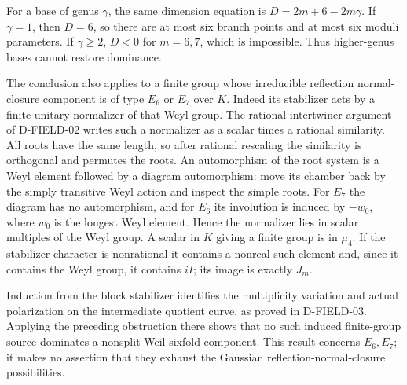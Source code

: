 For a base of genus \(\gamma\), the same dimension equation is
\(D=2m+6-2m\gamma\). If \(\gamma=1\), then \(D=6\), so there
are at most six branch points and at most six moduli parameters.
If \(\gamma\ge2\), \(D<0\) for \(m=6,7\), which is impossible.
Thus higher-genus bases cannot restore dominance.

The conclusion also applies to a finite group whose irreducible
reflection normal-closure component is of type \(E_6\) or \(E_7\)
over \(K\). Indeed its stabilizer acts by a finite unitary normalizer
of that Weyl group. The rational-intertwiner argument of D-FIELD-02
writes such a normalizer as a scalar times a rational similarity.
All roots have the same length, so after rational rescaling the similarity
is orthogonal and permutes the roots. An automorphism of the root system
is a Weyl element followed by a diagram automorphism: move its chamber
back by the simply transitive Weyl action and inspect the simple roots.
For \(E_7\) the diagram has no automorphism, and for \(E_6\) its
involution is induced by \(-w_0\), where \(w_0\) is the longest
Weyl element. Hence the normalizer lies in scalar multiples of the
Weyl group. A scalar in \(K\) giving a finite group is in \(\mu_4\).
If the stabilizer character is nonrational it contains a nonreal such
element and, since it contains the Weyl group, it contains \(iI\);
its image is exactly \(J_m\).

Induction from the block stabilizer identifies the multiplicity
variation and actual polarization on the intermediate quotient curve,
as proved in D-FIELD-03. Applying the preceding obstruction there shows
that no such induced finite-group source dominates a nonsplit Weil-sixfold
component. This result concerns \(E_6,E_7\); it makes no assertion
that they exhaust the Gaussian reflection-normal-closure possibilities.
